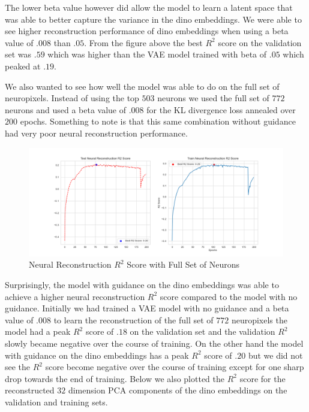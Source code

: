 \documentclass[12pt, letterpaper]{article}
\begin{document}
The lower beta value however did allow the model to learn a latent space that was able to better capture the variance in the dino embeddings. We were able to see higher reconstruction performance of dino embeddings when using a beta value of $.008$ than $.05$. From the figure above the best $R^2$ score on the validation set was $.59$ which was higher than the VAE model trained with beta of $.05$ which peaked at $.19$. 

We also wanted to see how well the model was able to do on the full set of neuropixels. Instead of using the top $503$ neurons we used the full set of $772$ neurons and used a beta value of $.008$ for the KL divergence loss annealed over $200$ epochs. Something to note is that this same combination without guidance had very poor neural reconstruction performance. 

\begin{figure}[H]
    \centering
    \includegraphics[width=1.0\textwidth]{x_r2_128dim_772_top_var_200_epochs_0.008_beta_2_layer_.9_pca_dino_embed.png}
    \caption{Neural Reconstruction $R^2$ Score with Full Set of Neurons}
    \label{fig:vae_guidance_dino_pca_full_neurons}
\end{figure}

Surprisingly, the model with guidance on the dino embeddings was able to achieve a higher neural reconstruction $R^2$ score compared to the model with no guidance. Initially we had trained a VAE model with no guidance and a beta value of $.008$ to learn the reconstruction of the full set of $772$ neuropixels the model had a peak $R^2$ score of $.18$ on the validation set and the validation $R^2$ slowly became negative over the course of training. On the other hand the model with guidance on the dino embeddings has a peak $R^2$ score of $.20$ but we did not see the $R^2$ score become negative over the course of training except for one sharp drop towards the end of training. Below we also plotted the $R^2$ score for the reconstructed $32$ dimension PCA components of the dino embeddings on the validation and training sets.
\end{document}
